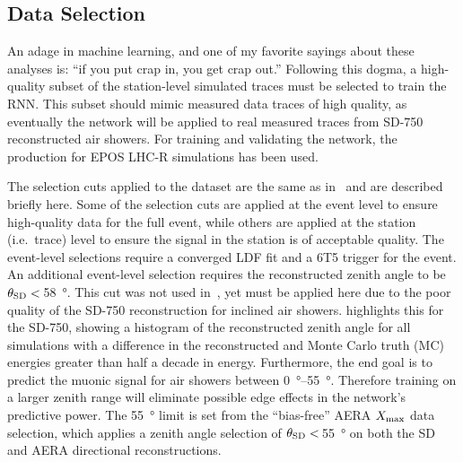 
\subsection{Data Selection}\label{ssec:selection}
An adage in machine learning, and one of my favorite sayings about these analyses is: ``if you put crap in, you get crap out.''
Following this dogma, a high-quality subset of the station-level simulated traces must be selected to train the RNN.
This subset should mimic measured data traces of high quality, as eventually the network will be applied to real measured traces from SD-750 reconstructed air showers.
For training and validating the network, the \Offline production for EPOS LHC-R simulations has been used.

The selection cuts applied to the dataset are the same as in~\cite{orazio_phd2023} and are described briefly here.
Some of the selection cuts are applied at the event level to ensure high-quality data for the full event, while others are applied at the station (i.e.~trace) level to ensure the signal in the station is of acceptable quality.
The event-level selections require a converged LDF fit and a 6T5 trigger for the event.
An additional event-level selection requires the reconstructed zenith angle to be $\theta_{\rm SD}<$\,\qty{58}{\degree}.
This cut was not used in~\cite{orazio_phd2023}, yet must be applied here due to the poor quality of the SD-750 reconstruction for inclined air showers.
 highlights this for the SD-750, showing a histogram of the reconstructed zenith angle for all simulations with a difference in the reconstructed and Monte Carlo truth (MC) energies greater than half a decade in energy.
Furthermore, the end goal is to predict the muonic signal for air showers between \qtyrange{0}{55}{\degree}.
Therefore training on a larger zenith range will eliminate possible edge effects in the network's predictive power.
The \qty{55}{\degree} limit is set from the ``bias-free'' AERA $X_{\rm max}$ data selection, which applies a zenith angle selection of $\theta_{\rm SD}<$\,\qty{55}{\degree} on both the SD and AERA directional reconstructions.

